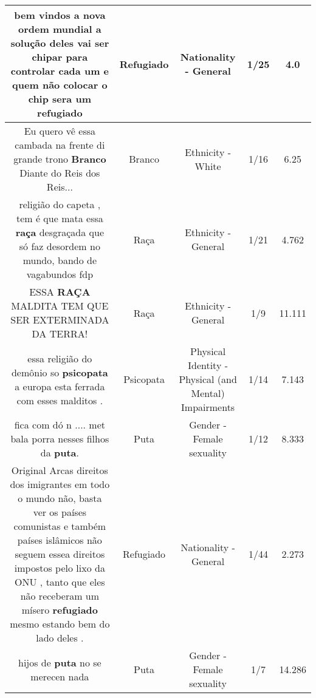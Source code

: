 \documentclass[11pt]{article}
\newlength\mylength
\begin{document}
\begin{center}
\begin{longtable}{|C{.65\mylength}|C{.30\mylength}|C{.12\mylength}|C{.12\mylength}|C{.12\mylength}|}
  \small bem vindos a nova ordem mundial a solução deles vai ser chipar para controlar cada um e quem não colocar o chip sera um refugiado\normalsize   & Refugiado & Nationality - General & 1/25 & 4.0 \\  \hline
  \small Eu quero vê essa cambada na frente di grande trono \textbf{Branco} Diante do Reis dos Reis...\normalsize   & Branco & Ethnicity - White & 1/16 & 6.25 \\  \hline
  \small religião do capeta  , tem é  que mata essa \textbf{raça} desgraçada  que só  faz desordem no mundo, bando de vagabundos fdp\normalsize   & Raça & Ethnicity - General & 1/21 & 4.762 \\  \hline
  \small ESSA \textbf{RAÇA} MALDITA TEM QUE SER EXTERMINADA DA TERRA!\normalsize   & Raça & Ethnicity - General & 1/9 & 11.111 \\  \hline
  \small essa religião do demônio so \textbf{psicopata} a europa esta ferrada com esses malditos .\normalsize   & Psicopata & Physical Identity - Physical (and Mental) Impairments & 1/14 & 7.143 \\  \hline
  \small fica com dó n .... met bala porra nesses filhos da \textbf{puta}.\normalsize   & Puta & Gender - Female sexuality & 1/12 & 8.333 \\  \hline
  \small Original Arcas direitos dos imigrantes em todo o mundo não,  basta ver os países  comunistas e também países  islâmicos não seguem essea direitos impostos pelo lixo da ONU , tanto que eles não  receberam um mísero \textbf{refugiado} mesmo estando bem do lado deles .\normalsize   & Refugiado & Nationality - General & 1/44 & 2.273 \\  \hline
  \small hijos de \textbf{puta} no se merecen nada\normalsize   & Puta & Gender - Female sexuality & 1/7 & 14.286 \\  \hline

\end{longtable}
\end{center}
\end{document}
